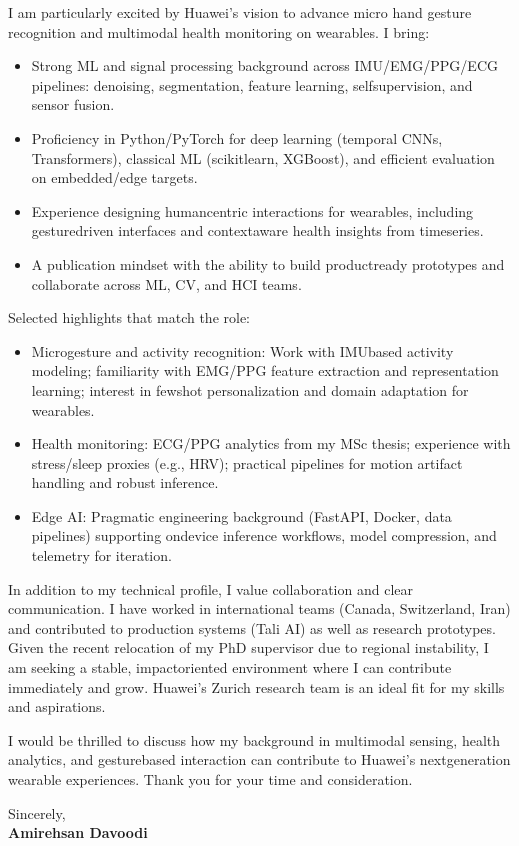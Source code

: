 \documentclass[11pt]{article}
\begin{document}
I am particularly excited by Huawei’s vision to advance micro hand gesture recognition and multimodal health monitoring on wearables. I bring:
\begin{itemize}
    \item Strong ML and signal processing background across IMU/EMG/PPG/ECG pipelines: denoising, segmentation, feature learning, self\textendash{}supervision, and sensor fusion.
    \item Proficiency in Python/PyTorch for deep learning (temporal CNNs, Transformers), classical ML (scikit\textendash{}learn, XGBoost), and efficient evaluation on embedded/edge targets.
    \item Experience designing human\textendash{}centric interactions for wearables, including gesture\textendash{}driven interfaces and context\textendash{}aware health insights from time\textendash{}series.
    \item A publication mindset with the ability to build product\textendash{}ready prototypes and collaborate across ML, CV, and HCI teams.
\end{itemize}

Selected highlights that match the role:
\begin{itemize}
    \item Micro\textendash{}gesture and activity recognition: Work with IMU\textendash{}based activity modeling; familiarity with EMG/PPG feature extraction and representation learning; interest in few\textendash{}shot personalization and domain adaptation for wearables.
    \item Health monitoring: ECG/PPG analytics from my MSc thesis; experience with stress/sleep proxies (e.g., HRV); practical pipelines for motion artifact handling and robust inference.
    \item Edge AI: Pragmatic engineering background (FastAPI, Docker, data pipelines) supporting on\textendash{}device inference workflows, model compression, and telemetry for iteration.
\end{itemize}

In addition to my technical profile, I value collaboration and clear communication. I have worked in international teams (Canada, Switzerland, Iran) and contributed to production systems (Tali AI) as well as research prototypes. Given the recent relocation of my PhD supervisor due to regional instability, I am seeking a stable, impact\textendash{}oriented environment where I can contribute immediately and grow. Huawei’s Zurich research team is an ideal fit for my skills and aspirations.

I would be thrilled to discuss how my background in multimodal sensing, health analytics, and gesture\textendash{}based interaction can contribute to Huawei’s next\textendash{}generation wearable experiences. Thank you for your time and consideration.

Sincerely,\\[6pt]
\textbf{Amirehsan Davoodi}
\end{document}
